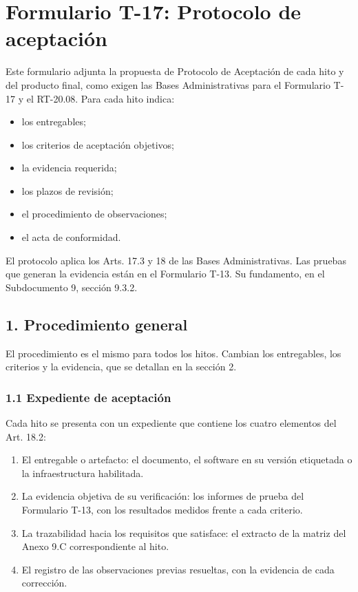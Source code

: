 \chapter{Formulario T-17: Protocolo de aceptación}\label{cap:sd9-t17}

Este formulario adjunta la propuesta de Protocolo de Aceptación de cada hito y del producto final, como exigen las Bases Administrativas para el Formulario T-17 y el RT-20.08. Para cada hito indica:

\begin{itemize}
\item los entregables;
\item los criterios de aceptación objetivos;
\item la evidencia requerida;
\item los plazos de revisión;
\item el procedimiento de observaciones;
\item el acta de conformidad.
\end{itemize}

El protocolo aplica los Arts. 17.3 y 18 de las Bases Administrativas. Las pruebas que generan la evidencia están en el Formulario T-13. Su fundamento, en el Subdocumento 9, sección 9.3.2.

\section*{1. Procedimiento general}

El procedimiento es el mismo para todos los hitos. Cambian los entregables, los criterios y la evidencia, que se detallan en la sección 2.

\subsection*{1.1 Expediente de aceptación}

Cada hito se presenta con un expediente que contiene los cuatro elementos del Art. 18.2:

\begin{enumerate}
\item El entregable o artefacto: el documento, el software en su versión etiquetada o la infraestructura habilitada.
\item La evidencia objetiva de su verificación: los informes de prueba del Formulario T-13, con los resultados medidos frente a cada criterio.
\item La trazabilidad hacia los requisitos que satisface: el extracto de la matriz del Anexo 9.C correspondiente al hito.
\item El registro de las observaciones previas resueltas, con la evidencia de cada corrección.
\end{enumerate}

